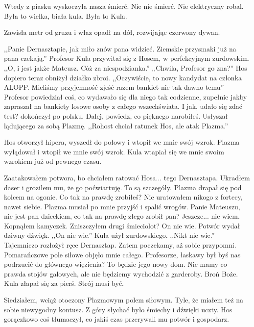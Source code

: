 Wtedy z piasku wyskoczyła nasza śmierć.
Nie nie śmierć. Nie elektryczny robal.
Była to wielka, biała kula.
Była to Kula.

Zawisła metr od gruzu i właz opadł na dół, rozwijając czerwony dywan.
\begin{dialogue}
\ds{} ,,Panie Dernasztapie, jak miło znów pana widzieć. Ziemskie przysmaki już na pana czekają.'' \dm{} Profesor Kula przywitał się z Hosem, w perfekcyjnym zurdowskim. \dm{} ,,O, i jest jakże Mateusz. Cóż za niespodzianka.''
\ds{} ,,Chwila, Profesor go zna?'' \dm{} Hos dopiero teraz obniżył działko zbroi.
\ds{} ,,Oczywiście, to nowy kandydat na członka ALOPP. Mieliśmy przyjemność zjeść razem bankiet nie tak dawno temu'' \dm{} 
Profesor powiedział coś, co wydawało się dla niego tak codzienne, zupełnie jakby zapraszał na bankiety losowe osoby z całego wszechświata. \dm{} I jak, udało się zdać test? \dm{} dokończył po polsku.
\ds{} Dalej, powiedz, co pięknego narobiłeś. \dm{} Usłyszał lądującego za sobą Plazmę. \dm{} ,,Rohost chciał ratunek Hos, ale atak Plazma.''
\end{dialogue}

Hos otworzył hipera, wyszedł do połowy i wtopił we mnie swój wzrok.
Plazma wylądował i wtopił we mnie swój wzrok.
Kula wtapiał się we mnie swoim wzrokiem już od pewnego czasu.

\begin{dialogue}
\ds{} Zaatakowałem potwora, bo chciałem ratować Hosa... tego Dernasztapa. Ukradłem daser i groziłem mu, że go poćwiartuję.
\ds{} To są szczegóły. \dm{} Plazma drapał się pod kolcem na ogonie. \dm{} Co tak na prawdę zrobiłeś?
\ds{} Nie uratowałem nikogo z fortecy, nawet siebie. Plazma musiał po mnie przyjść i spalić wrogów.
\ds{} Panie Mateuszu, nie jest pan dzieckiem, co tak na prawdę złego zrobił pan?
\ds{} Jeszcze... nie wiem. \dm{} Kopnąłem kamyczek. \dm{} Zniszczyłem drugi śmieciolot?
\ds{} On nie wie. \dm{} Potwór wydał dziwny dźwięk.
\ds{} ,,On nie wie.'' \dm{} Kula użył zurdowskiego.
\ds{} ,,Nikt nie wie.'' \dm{} Tajemniczo rozłożył ręce Dernasztap.
\ds{} Zatem poczekamy, aż sobie przypomni. \dm{} Pomarańczowe pole siłowe objęło mnie całego. \dm{} Profesorze, łaskawy był byś nas podrzucić do głównego więzienia? To będzie jego nowy dom.
Nie mamy co prawda stojów galowych, ale nie będziemy wychodzić z garderoby.
\ds{} Broń Boże. \dm{} Kula złapał się za pierś. \dm{} Strój musi być.
\end{dialogue}

Siedziałem, wciąż otoczony Plazmowym polem siłowym. Tyle, że miałem też na sobie niewygodny kontusz.
Z góry słychać było śmiechy i dźwięki uczty.
Hos gorączkowo coś tłumaczył, co jakiś czas przerywali mu potwór i gospodarz.

